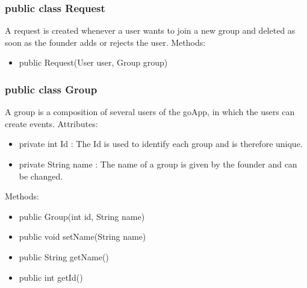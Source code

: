 	\subsubsection{public class Request}
	A request is created whenever a user wants to join a new group and deleted as soon as the founder adds or rejects the user.
	\newline
	Methods: 
	\begin{itemize}
	\item public Request(User user, Group group)
	\end{itemize}
	
	\subsubsection{public class Group}
	A group is a composition of several users of the goApp, in which the users can create events.
	\newline Attributes:
	\begin{itemize}
	\item private int Id : The Id is used to identify each group and is therefore unique.
	\item private String name : The name of a group is given by the founder and can be changed.
	\end{itemize}
	Methods:
	\begin{itemize}
	\item public Group(int id, String name)
	\item public void setName(String name)
	\item public String getName()
	\item public int getId()
	\end{itemize}

